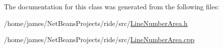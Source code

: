 The documentation for this class was generated from the following files\-:\begin{DoxyCompactItemize}
\item 
/home/james/\-Net\-Beans\-Projects/ride/src/\hyperlink{_line_number_area_8h}{Line\-Number\-Area.\-h}\item 
/home/james/\-Net\-Beans\-Projects/ride/src/\hyperlink{_line_number_area_8cpp}{Line\-Number\-Area.\-cpp}\end{DoxyCompactItemize}
